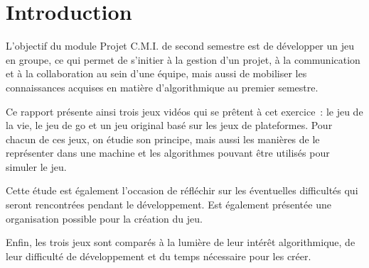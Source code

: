 \chapter*{Introduction}

L'objectif du module Projet C.M.I. de second semestre est
de développer un jeu en groupe, ce qui permet de s'initier
à la gestion d'un projet, à la communication et à la collaboration
au sein d'une équipe, mais aussi de mobiliser les connaissances
acquises en matière d'algorithmique au premier semestre.

Ce rapport présente ainsi trois jeux vidéos qui se prêtent
à cet exercice~: le jeu de la vie, le jeu de go et un jeu
original basé sur les jeux de plateformes. Pour chacun de ces jeux,
on étudie son principe, mais aussi les manières de le
représenter dans une machine et les algorithmes pouvant être
utilisés pour simuler le jeu.

Cette étude est également l'occasion de réfléchir sur les
éventuelles difficultés qui seront rencontrées pendant
le développement. Est également présentée une organisation
possible pour la création du jeu.

Enfin, les trois jeux sont comparés à la lumière de leur
intérêt algorithmique, de leur difficulté de développement
et du temps nécessaire pour les créer.
